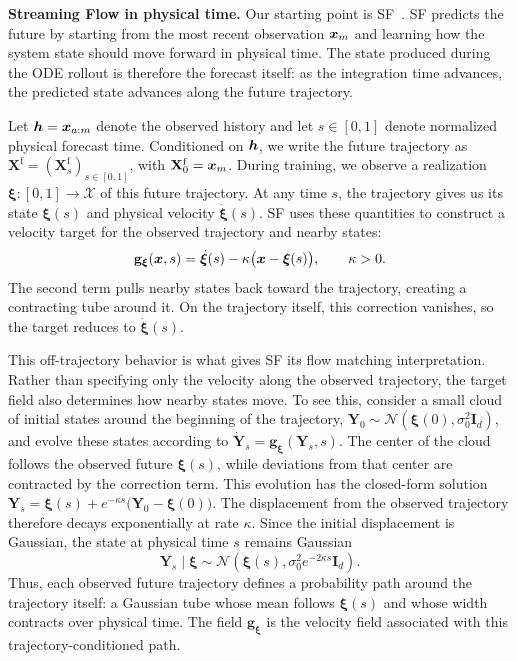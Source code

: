 \textbf{Streaming Flow in physical time.}
Our starting point is SF~\citep{jiang2025streaming}. SF predicts the future by
starting from the most recent observation ${\bm{x}}_m$ and learning how the system
state should move forward in physical time. The state produced during the ODE
rollout is therefore the forecast itself: as the integration time advances,
the predicted state advances along the future trajectory.

Let ${\bm{h}}={\bm{x}}_{a:m}$ denote the observed history and let $s\in[0,1]$ denote
normalized physical forecast time. Conditioned on ${\bm{h}}$, we write the future
trajectory as
$\mathbf{X}^{\mathrm{f}}
=(\mathbf{X}^{\mathrm{f}}_s)_{s\in[0,1]}$,
with $\mathbf{X}^{\mathrm{f}}_0={\bm{x}}_m$.
%
During training, we observe a realization
$\boldsymbol{\xi}:[0,1]\rightarrow\mathcal X$ of this future trajectory.
At any time $s$, the trajectory gives us its state
$\boldsymbol{\xi}(s)$ and physical velocity
$\dot{\boldsymbol{\xi}}(s)$. SF uses these quantities to construct a velocity
target for the observed trajectory and nearby states:
\begin{equation}
    \mathbf{g}_{\boldsymbol{\xi}}({\bm{x}},s)
    =
    \dot{\boldsymbol{\xi}}(s)
    -
    \kappa
    \bigl(
        {\bm{x}}-\boldsymbol{\xi}(s)
    \bigr),
    \qquad
    \kappa>0.
    \label{eq:continuous_sfp_field}
\end{equation}
%
The second term pulls nearby states back toward the trajectory, creating a
contracting tube around it. On the trajectory itself, this correction vanishes,
so the target reduces to $\dot{\boldsymbol{\xi}}(s)$.

This off-trajectory behavior is what gives SF its flow matching
interpretation. Rather than specifying only the velocity along the observed
trajectory, the target field also determines how nearby states move. To see
this, consider a small cloud of initial states around the beginning of the
trajectory,
$\mathbf{Y}_0\sim
\mathcal N(\boldsymbol{\xi}(0),\sigma_0^2\mathbf I_d)$,
and evolve these states according to
$\dot{\mathbf{Y}}_s=
\mathbf g_{\boldsymbol{\xi}}(\mathbf{Y}_s,s)$.
The center of the cloud follows the observed future
$\boldsymbol{\xi}(s)$, while deviations from that center are contracted by the
correction term.
%
This evolution has the closed-form solution
$
\mathbf{Y}_s
=
\boldsymbol{\xi}(s)
+
e^{-\kappa s}
\bigl(
\mathbf{Y}_0-\boldsymbol{\xi}(0)
\bigr)$.
%
The displacement from the observed trajectory therefore decays exponentially
at rate $\kappa$. Since the initial displacement is Gaussian, the state at
physical time $s$ remains Gaussian
\begin{equation}
\mathbf{Y}_s
\mid
\boldsymbol{\xi}
\sim
\mathcal N
\left(
\boldsymbol{\xi}(s),
\sigma_0^2 e^{-2\kappa s}\mathbf I_d
\right).
\label{eq:continuous_sfp_tube}
\end{equation}
Thus, each observed future trajectory defines a probability path around the
trajectory itself: a Gaussian tube whose mean follows
$\boldsymbol{\xi}(s)$ and whose width contracts over physical time.
The field $\mathbf g_{\boldsymbol{\xi}}$ is the velocity field associated with
this trajectory-conditioned path.

